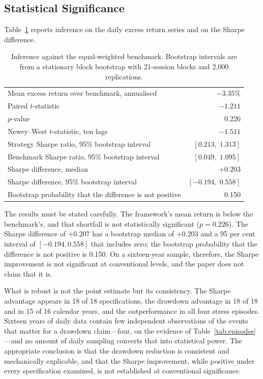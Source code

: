 \documentclass{singlecol-new}
\theoremstyle{TH}{
\newtheorem{lemma}{Lemma}
\newtheorem{theorem}[lemma]{Theorem}
\newtheorem{corrolary}[lemma]{Corrolary}
\newtheorem{conjecture}[lemma]{Conjecture}
\newtheorem{proposition}[lemma]{Proposition}
\newtheorem{claim}[lemma]{Claim}
\newtheorem{stheorem}[lemma]{Wrong Theorem}
\newtheorem{algorithm}{Algorithm}
}
\theoremstyle{THrm}{
\newtheorem{definition}{Definition}[section]
\newtheorem{question}{Question}[section]
\newtheorem{remark}{Remark}
\newtheorem{scheme}{Scheme}
}
\theoremstyle{THhit}{
\newtheorem{case}{Case}[section]
}
\begin{document}
\subsection{Statistical Significance}

Table~\ref{tab:inference} reports inference on the daily excess return series and on the Sharpe
difference.

\begin{table}[!ht]
\centering
\caption{Inference against the equal-weighted benchmark. Bootstrap intervals are from a
stationary block bootstrap with 21-session blocks and 2{,}000 replications.}
\label{tab:inference}
\small
\begin{tabular}{p{6.4cm}r}
\hline
Mean excess return over benchmark, annualised & $-3.35$\% \\
Paired $t$-statistic & $-1.211$ \\
$p$-value & 0.226 \\
Newey--West $t$-statistic, ten lags & $-1.511$ \\
\hline
Strategy Sharpe ratio, 95\% bootstrap interval & $[0.213, \; 1.313]$ \\
Benchmark Sharpe ratio, 95\% bootstrap interval & $[0.049, \; 1.095]$ \\
Sharpe difference, median & $+0.203$ \\
Sharpe difference, 95\% bootstrap interval & $[-0.194, \; 0.558]$ \\
Bootstrap probability that the difference is not positive & 0.150 \\
\hline
\end{tabular}
\end{table}

The results must be stated carefully. The framework's mean return is below the
benchmark's, and that shortfall is not statistically significant ($p = 0.226$). The
Sharpe difference of $+0.207$ has a bootstrap median of $+0.203$ and a 95 per cent
interval of $[-0.194, 0.558]$ that includes zero; the bootstrap probability that the
difference is not positive is 0.150. On a sixteen-year sample, therefore, the Sharpe
improvement is not significant at conventional levels, and the paper does not claim
that it is.

What is robust is not the point estimate but its consistency. The Sharpe advantage
appears in 18 of 18 specifications, the drawdown advantage in 18 of 18 and in 15 of 16
calendar years, and the outperformance in all four stress episodes. Sixteen years of
daily data contain few independent observations of the events that matter for a
drawdown claim---four, on the evidence of Table~\ref{tab:episodes}---and no amount of daily sampling
converts that into statistical power. The appropriate conclusion is that the drawdown
reduction is consistent and mechanically explicable, and that the Sharpe improvement,
while positive under every specification examined, is not established at conventional
significance.
\end{document}
